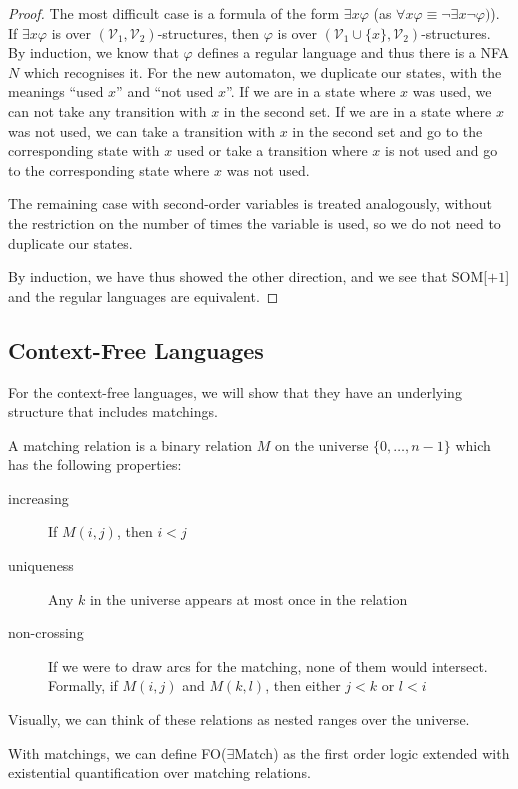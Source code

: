 \begin{proof}
    The most difficult case is a formula of the form $\exists x \varphi$ (as $\forall x \varphi \equiv \neg \exists x \neg \varphi)$).
    If $\exists x \varphi$ is over $(\mathcal{V}_1, \mathcal{V}_2)$-structures, then $\varphi$ is over $(\mathcal{V}_1 \cup \{x\}, \mathcal{V}_2)$-structures.
    By induction, we know that $\varphi$ defines a regular language and thus there is a NFA $N$ which recognises it.
    For the new automaton, we duplicate our states, with the meanings ``used $x$'' and ``not used $x$''.
    If we are in a state where $x$ was used, we can not take any transition with $x$ in the second set.
    If we are in a state where $x$ was not used, we can take a transition with $x$ in the second set and go to the corresponding state with $x$ used or take a transition where $x$ is not used and go to the corresponding state where $x$ was not used.

    The remaining case with second-order variables is treated analogously, without the restriction on the number of times the variable is used, so we do not need to duplicate our states.

    By induction, we have thus showed the other direction, and we see that SOM[$+ 1$] and the regular languages are equivalent.
\end{proof}

\subsection{Context-Free Languages}\label{subsec:des-context-free-languages}

For the context-free languages, we will show that they have an underlying structure that includes matchings.

A matching relation is a binary relation $M$ on the universe $\{0, \dots, n - 1\}$ which has the following properties:
\begin{description}
    \item[increasing] If $M(i, j)$, then $i < j$
    \item[uniqueness] Any $k$ in the universe appears at most once in the relation
    \item[non-crossing] If we were to draw arcs for the matching, none of them would intersect.
    Formally, if $M(i, j)$ and $M(k, l)$, then either $j < k$ or $l < i$
\end{description}
Visually, we can think of these relations as nested ranges over the universe.

With matchings, we can define FO($\exists$Match) as the first order logic extended with existential quantification over matching relations.

